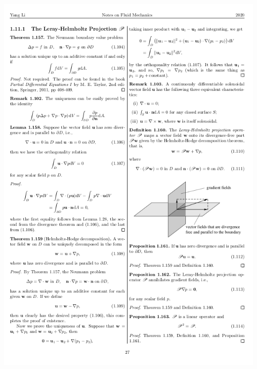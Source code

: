 \documentclass{beamer}
\begin{document}
\begin{CJK*}{UTF8}{gkai}
\begin{frame}
\begin{columns}
\begin{column}{.5\linewidth}
\begin{center}
          \includegraphics[scale=0.22]{./png/helmholtz}
        \end{center}
      \end{column}
    \end{columns}
  \end{frame}
  

\end{CJK*}
\end{document}

